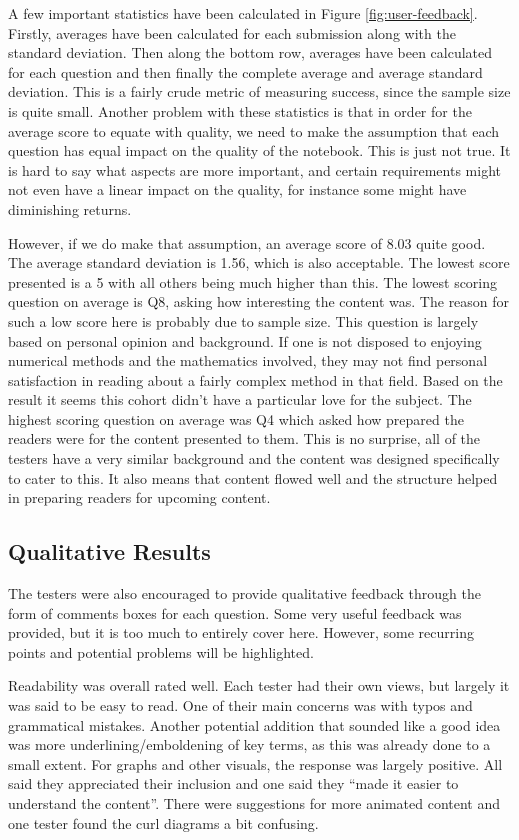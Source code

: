 A few important statistics have been calculated in Figure \ref{fig:user-feedback}. Firstly, averages have been calculated for each submission along with the standard deviation. Then along the bottom row, averages have been calculated for each question and then finally the complete average and average standard deviation. This is a fairly crude metric of measuring success, since the sample size is quite small. Another problem with these statistics is that in order for the average score to equate with quality, we need to make the assumption that each question has equal impact on the quality of the notebook. This is just not true. It is hard to say what aspects are more important, and certain requirements might not even have a linear impact on the quality, for instance some might have diminishing returns.

However, if we do make that assumption, an average score of 8.03 quite good. The average standard deviation is 1.56, which is also acceptable. The lowest score presented is a 5 with all others being much higher than this. The lowest scoring question on average is Q8, asking how interesting the content was. The reason for such a low score here is probably due to sample size. This question is largely based on personal opinion and background. If one is not disposed to enjoying numerical methods and the mathematics involved, they may not find personal satisfaction in reading about a fairly complex method in that field. Based on the result it seems this cohort didn't have a particular love for the subject. The highest scoring question on average was Q4 which asked how prepared the readers were for the content presented to them. This is no surprise, all of the testers have a very similar background and the content was designed specifically to cater to this. It also means that content flowed well and the structure helped in preparing readers for upcoming content.

\subsection{Qualitative Results}

The testers were also encouraged to provide qualitative feedback through the form of comments boxes for each question. Some very useful feedback was provided, but it is too much to entirely cover here. However, some recurring points and potential problems will be highlighted.

Readability was overall rated well. Each tester had their own views, but largely it was said to be easy to read. One of their main concerns was with typos and grammatical mistakes. Another potential addition that sounded like a good idea was more underlining/emboldening of key terms, as this was already done to a small extent. For graphs and other visuals, the response was largely positive. All said they appreciated their inclusion and one said they ``made it easier to understand the content''. There were suggestions for more animated content and one tester found the curl diagrams a bit confusing.

